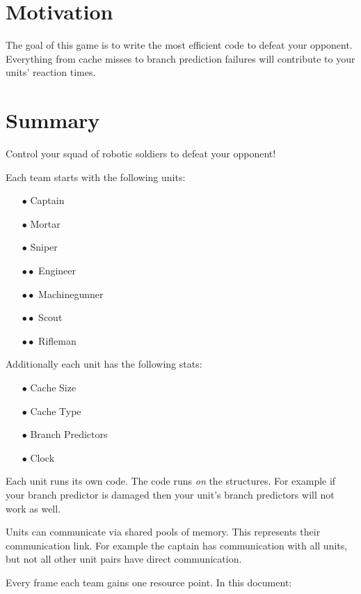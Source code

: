 \documentclass{article}
\begin{document}
\section*{Motivation}

The goal of this game is to write the most efficient code to defeat your
opponent. Everything from cache misses to branch prediction failures will
contribute to your units' reaction times.

\section*{Summary}

Control your squad of robotic soldiers to defeat your opponent!

Each team starts with the following units:

\begin{itemize}[noitemsep]
    \item[$\bullet$] Captain
    \item[$\bullet$] Mortar
    \item[$\bullet$] Sniper
    \item[$\bullet\bullet$] Engineer
    \item[$\bullet\bullet$] Machinegunner
    \item[$\bullet\bullet$] Scout
    \item[$\bullet\bullet$] Rifleman
\end{itemize}

Additionally each unit has the following stats:

\begin{itemize}[noitemsep]
    \item[$\bullet$] Cache Size
    \item[$\bullet$] Cache Type
    \item[$\bullet$] Branch Predictors
    \item[$\bullet$] Clock
\end{itemize}

Each unit runs its own code. The code runs \textit{on} the structures. For
example if your branch predictor is damaged then your unit's branch predictors
will not work as well.

Units can communicate via shared pools of memory. This represents their
communication link. For example the captain has communication with all units,
but not all other unit pairs have direct communication.

Every frame each team gains one resource point. In this document:
\end{document}
